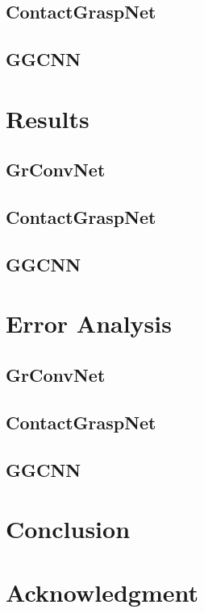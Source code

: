 \documentclass[conference]{IEEEtran}
\begin{document}
\subsection{ContactGraspNet}
\subsection{GGCNN}

\section{Results}
\subsection{GrConvNet}
\subsection{ContactGraspNet}
\subsection{GGCNN}

\section{Error Analysis}
\subsection{GrConvNet}
\subsection{ContactGraspNet}
\subsection{GGCNN}

\section{Conclusion}
% 


\section*{Acknowledgment}
% 




\end{document}
